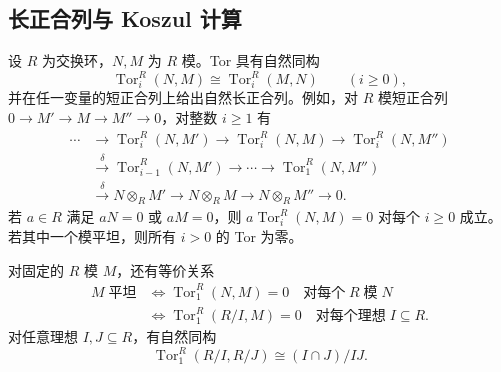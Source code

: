 \subsection{长正合列与 Koszul 计算}
\label{b3:subsec:1505:04}

\begin{lemma}\label{b3:lem:tor-basic-properties}
	设 \(R\) 为交换环，\(N,M\) 为 \(R\) 模。Tor 具有自然同构
	\[
		\operatorname{Tor}_i^R(N,M)\cong\operatorname{Tor}_i^R(M,N) \qquad(i\ge0),
	\]
	并在任一变量的短正合列上给出自然长正合列。例如，对 \(R\) 模短正合列 \(0\rightarrow M'\rightarrow M\rightarrow M''\rightarrow0\)，对整数 \(i\ge1\) 有
	\[
		\begin{aligned}
			\cdots&\longrightarrow\operatorname{Tor}_i^R(N,M') \longrightarrow\operatorname{Tor}_i^R(N,M) \longrightarrow\operatorname{Tor}_i^R(N,M'')\\
			&\xrightarrow{\delta}\operatorname{Tor}_{i-1}^R(N,M') \longrightarrow\cdots\longrightarrow\operatorname{Tor}_1^R(N,M'')\\
			&\xrightarrow{\delta}N\otimes_RM' \longrightarrow N\otimes_RM \longrightarrow N\otimes_RM''\longrightarrow0.
		\end{aligned}
	\]
	若 \(a\in R\) 满足 \(aN=0\) 或 \(aM=0\)，则 \(a\operatorname{Tor}_i^R(N,M)=0\) 对每个 \(i\ge0\) 成立。若其中一个模平坦，则所有 \(i>0\) 的 Tor 为零。

	对固定的 \(R\) 模 \(M\)，还有等价关系
	\[
		\begin{aligned}
			M\;\text{平坦} &\iff \operatorname{Tor}_1^R(N,M)=0 \quad\text{对每个}\;R\;\text{模}\;N\\
			&\iff \operatorname{Tor}_1^R(R/I,M)=0 \quad\text{对每个理想}\;I\subseteq R.
		\end{aligned}
	\]
	对任意理想 \(I,J\subseteq R\)，有自然同构
	\[
		\operatorname{Tor}_1^R(R/I,R/J)\cong(I\cap J)/IJ.
	\]
\end{lemma}
